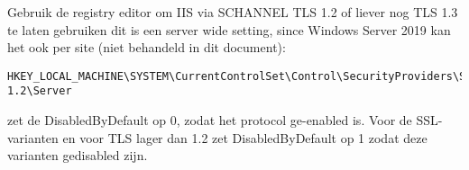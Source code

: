 Gebruik de registry editor om IIS via SCHANNEL TLS 1.2 of liever nog TLS 1.3 te laten gebruiken dit is een server wide setting, since Windows Server 2019 kan het ook per site (niet behandeld in dit document):
\begin{lstlisting}
HKEY_LOCAL_MACHINE\SYSTEM\CurrentControlSet\Control\SecurityProviders\SCHANNEL\Protocols\TLS 1.2\Server
\end{lstlisting}
zet de DisabledByDefault op 0, zodat het protocol ge-enabled is. Voor de SSL-varianten en voor TLS lager dan 1.2 zet DisabledByDefault op 1 zodat deze varianten gedisabled zijn.
